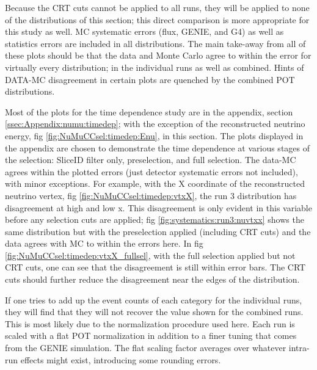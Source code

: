 \par Because the CRT cuts cannot be applied to all runs, they will be applied to none of the distributions of this section; this direct comparison is more appropriate for this study as well. MC systematic errors (flux, GENIE, and G4) as well as statistics errors are included in all distributions. The main take-away from all of these plots should be that the data and Monte Carlo agree to within the error for virtually every distribution; in the individual runs as well as combined. Hints of DATA-MC disagreement in certain plots are quenched by the combined POT distributions.

\par Most of the plots for the time dependence study are in the appendix, section \ref{ssec:Appendix:numu:timedep}; with the exception of the reconstructed neutrino energy, fig \ref{fig:NuMuCCsel:timedep:Enu}, in this section. The plots displayed in the appendix are chosen to demonstrate the time dependence at various stages of the selection: SliceID filter only, preselection, and full selection. The data-MC agrees within the plotted errors (just detector systematic errors not included), with minor exceptions. For example, with the X coordinate of the reconstructed neutrino vertex, fig \ref{fig:NuMuCCsel:timedep:vtxX}, the run 3 distribution has disagreement at high and low x. This disagreement is only evident in this variable before any selection cuts are applied; fig \ref{fig:systematics:run3:nuvtxx} shows the same distribution but with the preselection applied (including CRT cuts) and the data agrees with MC to within the errors here. In fig \ref{fig:NuMuCCsel:timedep:vtxX_fullsel}, with the full selection applied but not CRT cuts, one can see that the disagreement is still within error bars. The CRT cuts should further reduce the disagreement near the edges of the distribution.

\par If one tries to add up the event counts of each category for the individual runs, they will find that they will not recover the value shown for the combined runs. This is most likely due to the normalization procedure used here. Each run is scaled with a flat POT normalization in addition to a finer tuning that comes from the GENIE simulation. The flat scaling factor averages over whatever intra-run effects might exist, introducing some rounding errors.

